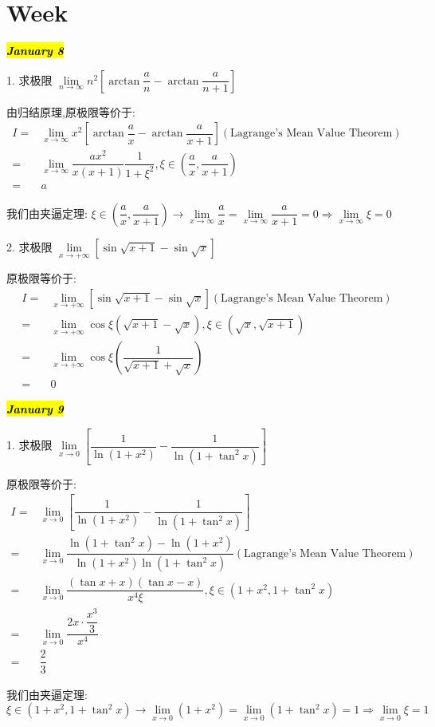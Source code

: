\section{Week }
\hl{\textbf{\textit{January 8}}}

1. 求极限 $\lim\limits_{n\to \infty}n^{2}\left[\arctan\dfrac{a}{n}-\arctan \dfrac{a}{n+1}\right]$
\begin{solution}
	
	由归结原理,原极限等价于:
	\begin{align*}
		I = & \lim\limits_{x\to \infty}x^{2}[\arctan\dfrac{a}{x}-\arctan \dfrac{a}{x+1}](\text{Lagrange's Mean Value Theorem})\\
		  = & \lim\limits_{x\to \infty}\dfrac{ax^{2}}{x(x+1)}\dfrac{1}{1+\xi^{2}},\xi\in(\dfrac{a}{x},\dfrac{a}{x+1})\\
		  = & a
	\end{align*}

	我们由夹逼定理: $\xi\in (\dfrac{a}{x},\dfrac{a}{x+1})\to \lim\limits_{x\to \infty}\dfrac{a}{x} = \lim\limits_{x\to \infty}\dfrac{a}{x+1}=0\Rightarrow \lim\limits_{x\to \infty}\xi = 0$
\end{solution}

2. 求极限 $\lim\limits_{x\to +\infty}[\sin\sqrt{x+1}-\sin\sqrt{x}]$
\begin{solution}
	
	原极限等价于:
	\begin{align*}
		I = & \lim\limits_{x\to +\infty}[\sin\sqrt{x+1}-\sin\sqrt{x}](\text{Lagrange's Mean Value Theorem})\\
		  = & \lim\limits_{x\to +\infty}\cos \xi(\sqrt{x+1}-\sqrt{x}),\xi\in(\sqrt{x},\sqrt{x+1})\\
		  = & \lim\limits_{x\to +\infty}\cos \xi(\dfrac{1}{\sqrt{x+1}+\sqrt{x}})\\
		  = & 0
	\end{align*}
\end{solution}

\hl{\textbf{\textit{January 9}}}

1. 求极限 $\lim\limits_{x\to 0}\left[\dfrac{1}{\ln(1+x^{2})}-\dfrac{1}{\ln(1+\tan^{2}x)}\right]$
\begin{solution}
	
	原极限等价于:
	\begin{align*}
		I = & \lim\limits_{x\to 0}\left[\dfrac{1}{\ln(1+x^{2})}-\dfrac{1}{\ln(1+\tan^{2}x)}\right]\\
		  = & \lim\limits_{x\to 0}\dfrac{\ln(1+\tan^{2}x)-\ln(1+x^{2})}{\ln(1+x^{2})\ln(1+\tan^{2}x)}(\text{Lagrange's Mean Value Theorem})\\
		  = & \lim\limits_{x\to 0}\dfrac{(\tan x+x)(\tan x-x)}{x^{4}\xi}, \xi\in(1+x^{2},1+\tan^{2}x)\\
		  = & \lim\limits_{x\to 0}\dfrac{2x\cdot \dfrac{x^{3}}{3}}{x^{4}}\\
		  = & \dfrac{2}{3}
	\end{align*}

	我们由夹逼定理: $\xi\in(1+x^{2},1+\tan^{2}x)\to \lim\limits_{x\to 0}(1+x^{2}) = \lim\limits_{x\to 0} (1+\tan^{2}x) = 1\Rightarrow \lim\limits_{x\to 0}\xi = 1$
\end{solution}

